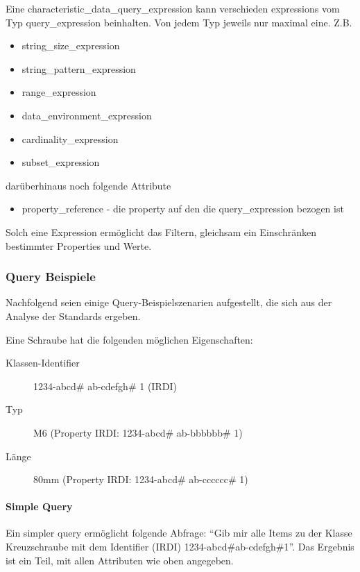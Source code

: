 Eine characteristic\_data\_query\_expression kann verschieden expressions vom Typ query\_expression beinhalten. Von jedem Typ jeweils nur maximal eine. 
Z.B.
\begin{itemize}
\item string\_size\_expression
\item string\_pattern\_expression
\item range\_expression
\item data\_environment\_expression
\item cardinality\_expression
\item subset\_expression
\end{itemize}
darüberhinaus noch folgende Attribute

\begin{itemize}
\item property\_reference - die property auf den die query\_expression bezogen ist
\end{itemize}
Solch eine Expression ermöglicht das Filtern, gleichsam ein Einschränken bestimmter Properties und Werte. 

\subsubsection{Query Beispiele}\label{kap:query_beispiele}

Nachfolgend seien einige Query-Beispielszenarien aufgestellt, die sich aus der Analyse der Standards ergeben.

Eine Schraube hat die folgenden möglichen Eigenschaften: 

\begin{description}
\item[Klassen-Identifier] 1234-abcd\# ab-cdefgh\# 1 (IRDI)
\item[Typ] M6 (Property IRDI: 1234-abcd\# ab-bbbbbb\# 1)
\item[Länge] 80mm (Property IRDI: 1234-abcd\# ab-cccccc\# 1)
\end{description}

\paragraph{Simple Query}

Ein simpler query ermöglicht folgende Abfrage: \enquote{Gib mir alle Items zu der Klasse Kreuzschraube mit dem Identifier (IRDI) 1234-abcd\#ab-cdefgh\#1}. Das Ergebnis ist ein Teil, mit allen Attributen wie oben angegeben. 

